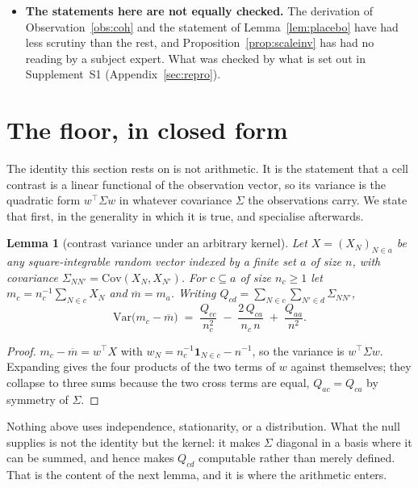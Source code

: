 \documentclass[11pt,a4paper]{article}
\theoremstyle{plain}
\newtheorem{lemma}[theorem]{Lemma}
\theoremstyle{definition}
\theoremstyle{remark}
\begin{document}
\begin{itemize}
\item \textbf{The statements here are not equally checked.} The
derivation of Observation~\ref{obs:coh} and the statement of
Lemma~\ref{lem:placebo} have had less scrutiny than the rest, and
Proposition~\ref{prop:scaleinv} has had no reading by a subject
expert. What was checked by what is set out in Supplement~S1
(Appendix~\ref{sec:repro}).
\end{itemize}

\section{The floor, in closed form}\label{sec:floor}

The identity this section rests on is not arithmetic. It is the
statement that a cell contrast is a linear functional of the observation
vector, so its variance is the quadratic form $w^{\!\top}\Sigma w$ in
whatever covariance $\Sigma$ the observations carry. We state that first,
in the generality in which it is true, and specialise afterwards.

\begin{lemma}[contrast variance under an arbitrary kernel]\label{lem:contrast}
Let $X=(X_N)_{N\in a}$ be any square-integrable random vector indexed by
a finite set $a$ of size $n$, with covariance
$\Sigma_{NN'}=\mathrm{Cov}(X_N,X_{N'})$. For $c\subseteq a$ of size
$n_c\ge1$ let $m_c=n_c^{-1}\sum_{N\in c}X_N$ and
$\overline m=m_a$. Writing
$Q_{cd}=\sum_{N\in c}\sum_{N'\in d}\Sigma_{NN'}$,
\begin{equation}\label{eq:contrast}
  \mathrm{Var}\bigl(m_c-\overline m\bigr)
  \;=\;\frac{Q_{cc}}{n_c^{2}}
  \;-\;\frac{2\,Q_{ca}}{n_c\,n}
  \;+\;\frac{Q_{aa}}{n^{2}}.
\end{equation}
\end{lemma}

\begin{proof}
$m_c-\overline m=w^{\!\top}X$ with $w_N=n_c^{-1}\mathbf 1_{N\in c}-n^{-1}$,
so the variance is $w^{\!\top}\Sigma w$. Expanding gives the four
products of the two terms of $w$ against themselves; they collapse to
three sums because the two cross terms are equal, $Q_{ac}=Q_{ca}$ by
symmetry of $\Sigma$.
\end{proof}

Nothing above uses independence, stationarity, or a distribution. What
the null supplies is not the identity but the kernel: it makes $\Sigma$
diagonal in a basis where it can be summed, and hence makes $Q_{cd}$
computable rather than merely defined. That is the content of the next
lemma, and it is where the arithmetic enters.
\end{document}
